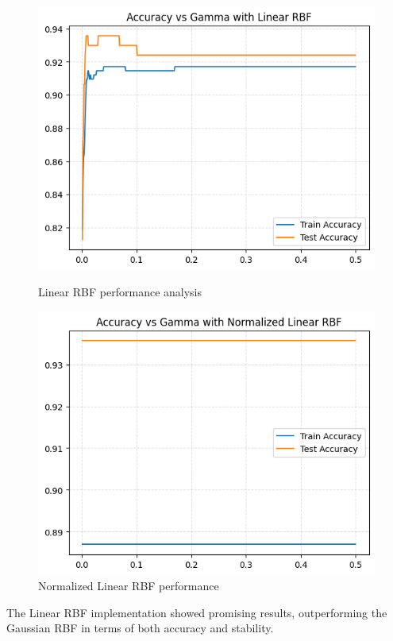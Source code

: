 \documentclass[11pt]{article}
\begin{document}
\begin{figure}[H]
  \centering
  \begin{minipage}{0.48\textwidth}
    \includegraphics[width=\linewidth]{img/LinearRBF.png}
    \caption{Linear RBF performance analysis}
  \end{minipage}
  \hfill
  \begin{minipage}{0.48\textwidth}
    \includegraphics[width=\linewidth]{img/LinearNRBF.png}
    \caption{Normalized Linear RBF performance}
  \end{minipage}
\end{figure}

The Linear RBF implementation showed promising results, outperforming the Gaussian RBF in terms of both accuracy and stability.
\end{document}
